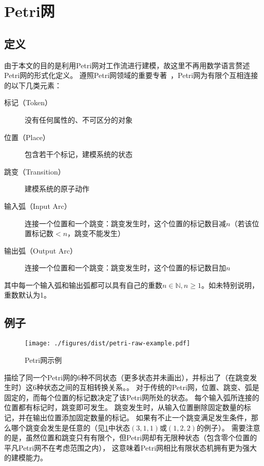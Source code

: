 \documentclass[index]{subfiles}
\begin{document}
\section{Petri网}
\subsection{定义}
由于本文的目的是利用Petri网对工作流进行建模，故这里不再用数学语言赘述Petri网的形式化定义。
遵照Petri网领域的重要专著~，Petri网为有限个互相连接的以下几类元素：
\begin{description}
  \item[标记（Token）] 没有任何属性的、不可区分的对象
  \item[位置（Place）] 包含若干个标记，建模系统的状态
  \item[跳变（Transition）] 建模系统的原子动作
  \item[输入弧（Input Arc）] 连接一个位置和一个跳变：跳变发生时，这个位置的标记数目减$n$（若该位置标记数$<n$，跳变不能发生）
  \item[输出弧（Output Arc）] 连接一个位置和一个跳变：跳变发生时，这个位置的标记数目加$n$
\end{description}
其中每一个输入弧和输出弧都可以具有自己的重数$n\in\mathbb{N}, n\geq1$。如未特别说明，重数默认为1。

\subsection{例子}
\begin{figure}[h]
  \centering
  \texttt{[image: ./figures/dist/petri-raw-example.pdf]}
  \caption{Petri网示例\label{fig:petri-raw}}
\end{figure}
描绘了同一个Petri网的6种不同状态（更多状态并未画出），并标出了（在跳变发生时）这6种状态之间的互相转换关系。。
对于传统的Petri网，位置、跳变、弧是固定的，而每个位置的标记数决定了该Petri网所处的状态。
每个输入弧所连接的位置都有标记时，跳变即可发生。
跳变发生时，从输入位置删除固定数量的标记，并在输出位置添加固定数量的标记。
如果有不止一个跳变满足发生条件，那么哪个跳变会发生是任意的（见\cref{fig:petri-raw}中状态$(3,1,1)$或$(1,2,2)$的例子）。
需要注意的是，虽然位置和跳变只有有限个，但Petri网却有无限种状态（包含零个位置的平凡Petri网不在考虑范围之内），
这意味着Petri网相比有限状态机拥有更为强大的建模能力。
\end{document}
